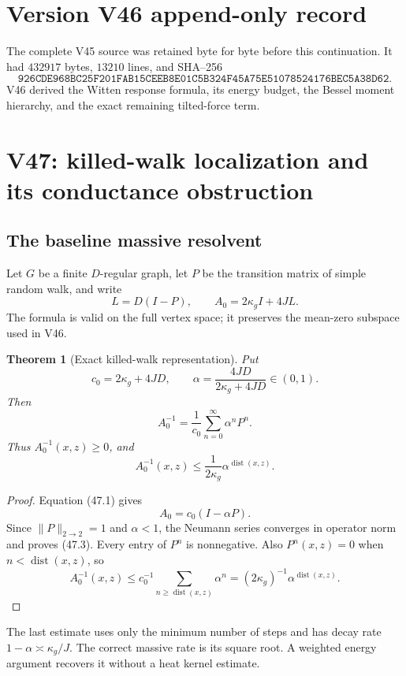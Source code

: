 \documentclass[11pt]{article}
\newtheorem{theorem}{Theorem}[section]
\theoremstyle{remark}
\begin{document}
\section*{Version V46 append-only record}
The complete V45 source was retained byte for byte before this
continuation.  It had \(432917\) bytes, \(13210\) lines, and SHA--256
\[
 \texttt{926CDE968BC25F201FAB15CEEB8E01C5B324F45A75E51078524176BEC5A38D62}.
\]
V46 derived the Witten response formula, its energy budget, the
Bessel moment hierarchy, and the exact remaining tilted-force term.


\section{V47: killed-walk localization and its conductance obstruction}
\label{sec:v17v47}

\subsection{The baseline massive resolvent}

Let \(G\) be a finite \(D\)-regular graph, let \(P\) be the transition
matrix of simple random walk, and write
\[
 L=D(I-P),\qquad A_0=2\kappa_gI+4JL.               \tag{47.1}
\]
The formula is valid on the full vertex space; it preserves the
mean-zero subspace used in V46.

\begin{theorem}[Exact killed-walk representation]
\label{thm:v17v47-walk}
Put
\[
 c_0=2\kappa_g+4JD,\qquad
 \alpha=\frac{4JD}{2\kappa_g+4JD}\in(0,1).        \tag{47.2}
\]
Then
\[
\boxed{
 A_0^{-1}
 =
 \frac1{c_0}\sum_{n=0}^\infty\alpha^nP^n.}        \tag{47.3}
\]
Thus \(A_0^{-1}(x,z)\geq0\), and
\[
 A_0^{-1}(x,z)
 \leq\frac1{2\kappa_g}
 \alpha^{\operatorname{dist}(x,z)}.               \tag{47.4}
\]
\end{theorem}

\begin{proof}
Equation (47.1) gives
\[
 A_0=c_0(I-\alpha P).
\]
Since \(\|P\|_{2\to2}=1\) and \(\alpha<1\), the Neumann series
converges in operator norm and proves (47.3).  Every entry of \(P^n\)
is nonnegative.  Also \(P^n(x,z)=0\) when
\(n<\operatorname{dist}(x,z)\), so
\[
 A_0^{-1}(x,z)
 \leq c_0^{-1}\sum_{n\geq\operatorname{dist}(x,z)}\alpha^n
 =(2\kappa_g)^{-1}\alpha^{\operatorname{dist}(x,z)}.
\]
\end{proof}

The last estimate uses only the minimum number of steps and has decay
rate \(1-\alpha\asymp\kappa_g/J\).  The correct massive rate is its
square root.  A weighted energy argument recovers it without a heat
kernel estimate.
\end{document}
